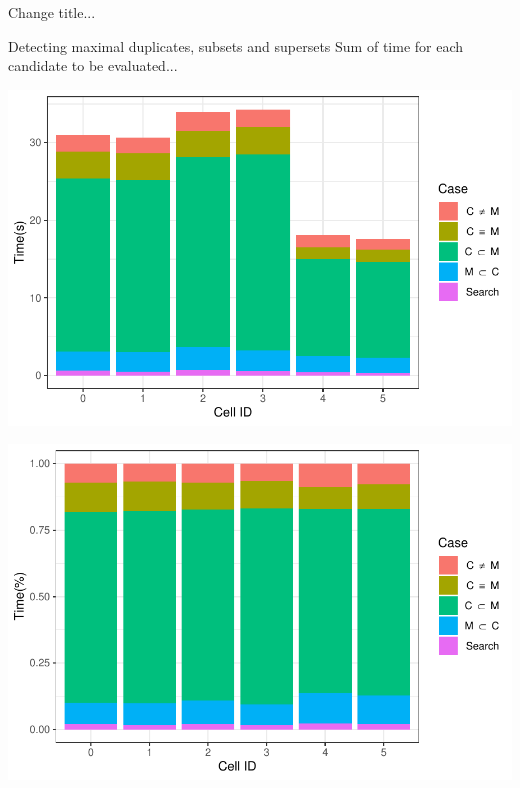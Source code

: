 \documentclass{beamer}
\begin{document}
\begin{frame}{Change title...}
        \centering
\end{frame}

\begin{frame}{Detecting maximal duplicates, subsets and supersets}
        {Sum of time for each candidate to be evaluated...}
        \centering
        \begin{minipage}{0.49\textwidth}
                \includegraphics[width=\textwidth]{figures/Maximals/performanceBySum1}
        \end{minipage} %
        \begin{minipage}{0.49\textwidth}
                \includegraphics[width=\textwidth]{figures/Maximals/performanceBySum2}
        \end{minipage}
\end{frame}
\end{document}
